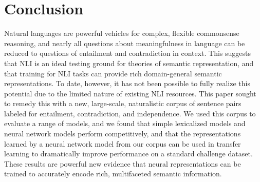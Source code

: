 \section{Conclusion}\label{sec:conclusion}

Natural languages are powerful vehicles for complex, flexible
commonsense reasoning, and nearly all questions about meaningfulness
in language can be reduced to questions of entailment
and contradiction in context. This suggests that NLI is an ideal testing ground
for theories of semantic representation, and that training for NLI
tasks can provide rich domain-general semantic representations.  To
date, however, it has not been possible to fully realize this
potential due to the limited nature of existing NLI resources.  This
paper sought to remedy this with a new, large-scale, naturalistic
corpus of sentence pairs labeled for entailment, contradiction, and
independence. We used this corpus to evaluate a range of models,
and we found that simple lexicalized models and neural network
models perform competitively, and that the representations learned by
a neural network model from our corpus can be used in transfer learning
to dramatically improve performance on a standard challenge dataset.
These results are powerful new evidence that neural representations
can be trained to accurately encode rich, multifaceted semantic
information.
